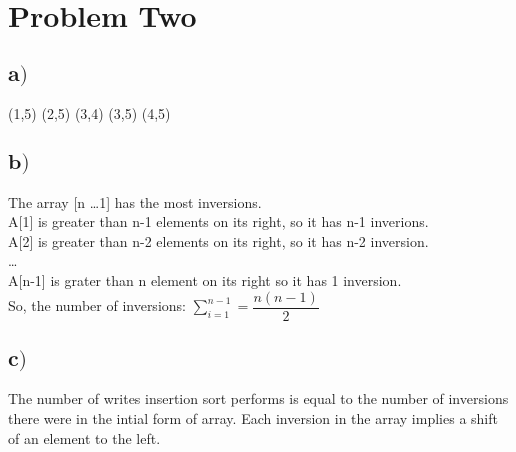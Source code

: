 \documentclass[a4paper,12pt]{article}
\begin{document}
\section{Problem Two}
\subsection*{\(\mathbf a)\)}
(1,5) (2,5) (3,4) (3,5) (4,5)
\subsection*{\(\mathbf b)\)}
The array [n \dots 1] has the most inversions.\\
A[1] is greater than n-1 elements on its right, so it has n-1 inverions.\\
A[2] is greater than n-2 elements on its right, so it has n-2 inversion.\\
\dots\\
A[n-1] is grater than n element on its right so it has 1 inversion.\\
So, the number of inversions: \(\sum_{i=1}^{n-1} = \dfrac{n(n-1)}{2} \) 
\subsection*{\(\mathbf c)\)}
The number of writes insertion sort performs is equal to the number of inversions there were in the intial
form of array. Each inversion in the array implies a shift of an element to the left.
\end{document}

